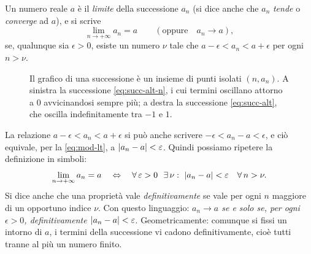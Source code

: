 \begin{definizione}\label{def:limite}
Un numero reale $a$ è il \emph{limite} della successione $a_{n}$ (si dice anche che
$a_{n}$ \emph{tende} o \emph{converge} ad $a$), e si scrive
\begin{equation}\label{eq:lim-notazione}
  \lim_{n\to+\infty}a_{n}=a \qquad(\text{oppure}\quad a_{n}\to a),
\end{equation}
se, qualunque sia $\epsilon>0$, esiste un numero $\nu$ tale che
$a-\epsilon<a_{n}<a+\epsilon$ per ogni $n>\nu$.
\end{definizione}

\begin{figure}[htb]
\centering
{}\hfill
{}
\caption{Il grafico di una successione è un insieme di punti isolati $(n,a_{n})$. A
sinistra la successione \eqref{eq:succ-alt-n}, i cui termini oscillano attorno a $0$
avvicinandosi sempre più; a destra la successione \eqref{eq:succ-alt}, che oscilla
indefinitamente tra $-1$ e $1$.}
\label{fig:grafici-successioni}
\end{figure}

La relazione $a-\epsilon<a_{n}<a+\epsilon$ si può anche scrivere
$-\epsilon<a_{n}-a<\epsilon$, e ciò equivale, per la \eqref{eq:mod-lt}, a
$\lvert a_{n}-a\rvert<\varepsilon$. Quindi possiamo ripetere la definizione in simboli:
\begin{equation}\label{eq:def-limite}
  \lim_{n\to+\infty}a_{n}=a \quad\sse\quad
  \perogni\epsilon>0\ \ \esiste\nu : \ \abs{a_{n}-a}<\epsilon\quad\perogni n>\nu .
\end{equation}
Si dice anche che una proprietà vale \emph{definitivamente} se vale
per ogni $n$ maggiore di un opportuno indice $\nu$. Con questo linguaggio:
\emph{$a_{n}\to a$ se e solo se, per ogni $\epsilon>0$, definitivamente
$\lvert a_{n}-a\rvert<\varepsilon$}. Geometricamente: comunque si fissi un intorno di $a$, i termini
della successione vi cadono definitivamente, cioè tutti tranne al più un numero finito.

